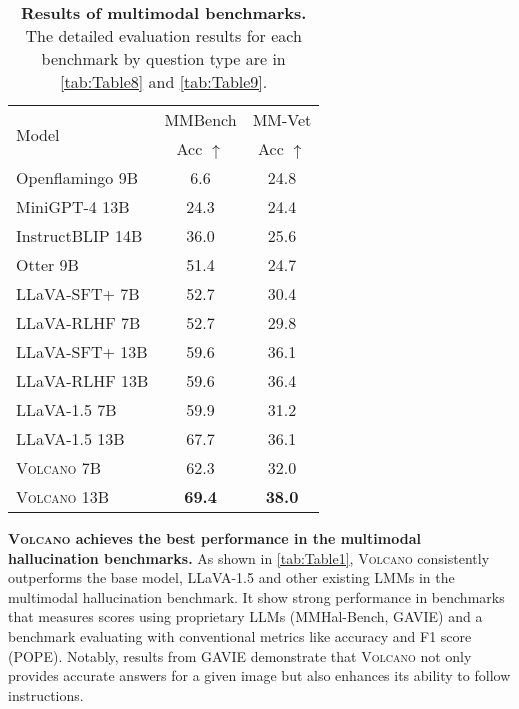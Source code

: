 \documentclass[11pt]{article}
\newcommand{\Ours}{\textsc{Volcano}}
\begin{document}
\begin{table}[t]
\centering
\small
\begin{tabular}{lc|c}
\toprule
\multirow{2}{*}{Model} & \multicolumn{1}{c|}{MMBench} & \multicolumn{1}{c}{MM-Vet} \\
& Acc $\uparrow$ & Acc $\uparrow$ \\
\midrule
Openflamingo 9B & 6.6 & 24.8\\
MiniGPT-4 13B & 24.3 & 24.4 \\
InstructBLIP 14B & 36.0 & 25.6 \\
Otter 9B & 51.4	& 24.7  \\
LLaVA-SFT+ 7B & 52.7 & 30.4 \\
LLaVA-RLHF 7B & 52.7 & 29.8 \\
LLaVA-SFT+ 13B & 59.6 & 36.1 \\
LLaVA-RLHF 13B  & 59.6 & 36.4 \\
\midrule
LLaVA-1.5 7B & 59.9 & 31.2 \\
LLaVA-1.5 13B & 67.7 & 36.1 \\
{\Ours} 7B & 62.3 & 32.0 \\
{\Ours} 13B & \textbf{69.4} & \textbf{38.0} \\
\bottomrule
\end{tabular}
\caption{\textbf{Results of multimodal benchmarks.} The detailed evaluation results for each benchmark by question type are in \autoref{tab:Table8} and \autoref{tab:Table9}.}
\label{tab:Table3}
\end{table}
\textbf{{\Ours} achieves the best performance in the multimodal hallucination benchmarks.} As shown in \autoref{tab:Table1}, {\Ours} consistently outperforms the base model, LLaVA-1.5 and other existing LMMs in the multimodal hallucination benchmark. It show strong performance in benchmarks that measures scores using proprietary LLMs (MMHal-Bench, GAVIE) and a benchmark evaluating with conventional metrics like accuracy and F1 score (POPE). Notably, results from GAVIE demonstrate that {\Ours} not only provides accurate answers for a given image but also enhances its ability to follow instructions. \\
\end{document}
